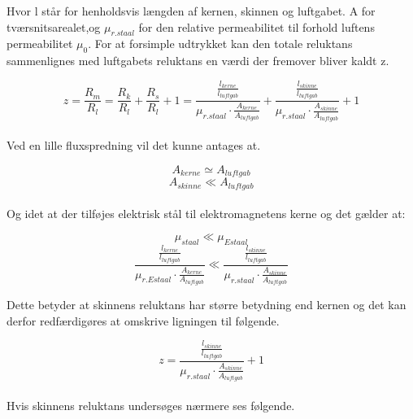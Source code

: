 Hvor l står for henholdsvis længden af kernen, skinnen og luftgabet. A for tværsnitsarealet,og $ \mu_{r.staal} $ for den relative permeabilitet til forhold luftens permeabilitet $\mu_0$.  For at forsimple udtrykket kan den totale reluktans sammenlignes med luftgabets reluktans en værdi  der fremover bliver kaldt z.

\begin{equation}
z = \frac{R_m}{R_l} = \frac{R_k}{R_l} +\frac{R_s}{R_l} + 1 = \frac{
\frac{l_{kerne}}{l_{luftgab}} }
	{\mu_{r.staal} \cdot \frac{A_{kerne}}{A_{luftgab}} }
+
\frac{
	\frac{l_{skinne}}{l_{luftgab}} }
{\mu_{r.staal} \cdot \frac{A_{skinne}}{A_{luftgab}} }
+ 1
\end{equation}
\\
Ved en lille fluxspredning vil det kunne antages at.

\begin{equation}
A_{kerne} \simeq A_{luftgab}
\end{equation}
\begin{equation}
A_{skinne} \ll A_{luftgab}
\end{equation}
\\
Og idet at der tilføjes elektrisk stål til elektromagnetens kerne og det gælder at:

\begin{equation}
\mu_{staal} \ll \mu_{Estaal}
\end{equation}
\begin{equation}
  \frac{\frac{l_{kerne}}{l_{luftgab}}}{
  	{\mu_{r.Estaal} \cdot \frac{A_{kerne}}{A_{luftgab}} }} \ll \frac{
	\frac{l_{skinne}}{l_{luftgab}} }
{\mu_{r.staal} \cdot \frac{A_{skinne}}{A_{luftgab}} }
\end{equation}

Dette betyder at skinnens reluktans har større betydning end kernen og det kan derfor redfærdigøres at omskrive ligningen til følgende.

\begin{equation}
z =
\frac{
	\frac{l_{skinne}}{l_{luftgab}} }
{\mu_{r.staal} \cdot \frac{A_{skinne}}{A_{luftgab}} }
+ 1
\end{equation}
\\
Hvis skinnens reluktans undersøges nærmere ses følgende.


